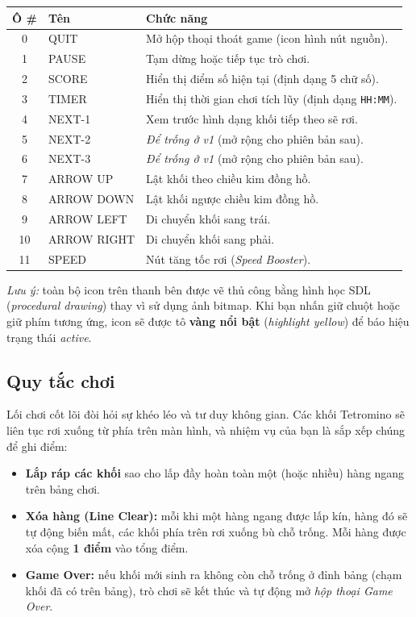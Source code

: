 \documentclass[12pt,a4paper]{article}
\begin{document}
\vspace{4pt}
\begin{tabularx}{\linewidth}{|c|l|X|}
    \hline
    \textbf{Ô \#} & \textbf{Tên} & \textbf{Chức năng} \\
    \hline
    0  & QUIT        & Mở hộp thoại thoát game (icon hình nút nguồn). \\
    \hline
    1  & PAUSE       & Tạm dừng hoặc tiếp tục trò chơi. \\
    \hline
    2  & SCORE       & Hiển thị điểm số hiện tại (định dạng 5 chữ số). \\
    \hline
    3  & TIMER       & Hiển thị thời gian chơi tích lũy (định dạng \texttt{HH:MM}). \\
    \hline
    4  & NEXT-1      & Xem trước hình dạng khối tiếp theo sẽ rơi. \\
    \hline
    5  & NEXT-2      & \textit{Để trống ở v1} (mở rộng cho phiên bản sau). \\
    \hline
    6  & NEXT-3      & \textit{Để trống ở v1} (mở rộng cho phiên bản sau). \\
    \hline
    7  & ARROW UP    & Lật khối theo chiều kim đồng hồ. \\
    \hline
    8  & ARROW DOWN  & Lật khối ngược chiều kim đồng hồ. \\
    \hline
    9  & ARROW LEFT  & Di chuyển khối sang trái. \\
    \hline
    10 & ARROW RIGHT & Di chuyển khối sang phải. \\
    \hline
    11 & SPEED       & Nút tăng tốc rơi (\textit{Speed Booster}). \\
    \hline
\end{tabularx}

\vspace{4pt}
\noindent\textit{Lưu ý:} toàn bộ icon trên thanh bên được vẽ thủ công bằng hình học SDL (\textit{procedural drawing}) thay vì sử dụng ảnh bitmap. Khi bạn nhấn giữ chuột hoặc giữ phím tương ứng, icon sẽ được tô \textbf{vàng nổi bật} (\textit{highlight yellow}) để báo hiệu trạng thái \textit{active}.

\subsection{Quy tắc chơi}
Lối chơi cốt lõi đòi hỏi sự khéo léo và tư duy không gian. Các khối Tetromino sẽ liên tục rơi xuống từ phía trên màn hình, và nhiệm vụ của bạn là sắp xếp chúng để ghi điểm:
\begin{itemize}
    \item \textbf{Lắp ráp các khối} sao cho lấp đầy hoàn toàn một (hoặc nhiều) hàng ngang trên bảng chơi.
    \item \textbf{Xóa hàng (Line Clear):} mỗi khi một hàng ngang được lấp kín, hàng đó sẽ tự động biến mất, các khối phía trên rơi xuống bù chỗ trống. Mỗi hàng được xóa cộng \textbf{1 điểm} vào tổng điểm.
    \item \textbf{Game Over:} nếu khối mới sinh ra không còn chỗ trống ở đỉnh bảng (chạm khối đã có trên bảng), trò chơi sẽ kết thúc và tự động mở \textit{hộp thoại Game Over}.
\end{itemize}
\end{document}
